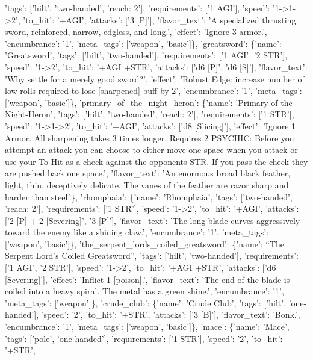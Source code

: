 \documentclass[
  letterpaper,
  DIV=11,
  numbers=noendperiod]{scrartcl}
\begin{document}
{'tags': {[}'hilt', 'two-handed', 'reach: 2'{]}, 'requirements': {[}'1
AGI'{]}, 'speed': '1-\textgreater1-\textgreater2', 'to\_hit': '+AGI',
'attacks': {[}'3 {[}P{]}'{]}, 'flavor\_text': 'A specialized thrusting
sword, reinforced, narrow, edgless, and long.', 'effect': 'Ignore 3
armor.', 'encumbrance': '1', 'meta\_tags': {[}'weapon', 'basic'{]}\},
'greatsword': \{'name': 'Greatsword', 'tags': {[}'hilt',
'two-handed'{]}, 'requirements': {[}'1 AGI', '2 STR'{]}, 'speed':
'1-\textgreater2', 'to\_hit': '+AGI +STR', 'attacks': {[}'d6 {[}P{]}',
'd6 {[}S{]}'{]}, 'flavor\_text': 'Why settle for a merely good sword?',
'effect': 'Robust Edge: increase number of low rolls required to lose
{[}sharpened{]} buff by 2', 'encumbrance': '1', 'meta\_tags':
{[}'weapon', 'basic'{]}\}, 'primary\_of\_the\_night\_heron': \{'name':
'Primary of the Night-Heron', 'tags': {[}'hilt', 'two-handed', 'reach:
2'{]}, 'requirements': {[}'1 STR'{]}, 'speed':
'1-\textgreater1-\textgreater2', 'to\_hit': '+AGI', 'attacks': {[}'d8
{[}Slicing{]}'{]}, 'effect': 'Ignore 1 Armor. All sharpening takes 3
times longer. Requires 2 PSYCHIC: Before you attempt an attack you can
choose to either move one space when you attack or use your To-Hit as a
check against the opponents STR. If you pass the check they are pushed
back one space.', 'flavor\_text': 'An enormous broad black feather,
light, thin, deceptively delicate. The vanes of the feather are razor
sharp and harder than steel.'\}, 'rhomphaia': \{'name': 'Rhomphaia',
'tags': {[}'two-handed', 'reach: 2'{]}, 'requirements': {[}'1 STR'{]},
'speed': '1-\textgreater2', 'to\_hit': '+AGI', 'attacks': {[}'2 {[}P{]}
+ 2 {[}Severing{]}', '3 {[}P{]}'{]}, 'flavor\_text': 'The long blade
curves aggressively toward the enemy like a shining claw.',
'encumbrance': '1', 'meta\_tags': {[}'weapon', 'basic'{]}\},
'the\_serpent\_lords\_coiled\_greatsword': \{'name': ``The Serpent
Lord's Coiled Greatsword'', 'tags': {[}'hilt', 'two-handed'{]},
'requirements': {[}'1 AGI', '2 STR'{]}, 'speed': '1-\textgreater2',
'to\_hit': '+AGI +STR', 'attacks': {[}'d6 {[}Severing{]}'{]}, 'effect':
'Inflict 1 {[}poison{]}.', 'flavor\_text': 'The end of the blade is
coiled into a heavy spiral. The metal has a green shine.',
'encumbrance': '1', 'meta\_tags': {[}'weapon'{]}\}, 'crude\_club':
\{'name': 'Crude Club', 'tags': {[}'hilt', 'one-handed'{]}, 'speed':
'2', 'to\_hit': '+STR', 'attacks': {[}'3 {[}B{]}'{]}, 'flavor\_text':
'Bonk.', 'encumbrance': '1', 'meta\_tags': {[}'weapon', 'basic'{]}\},
'mace': \{'name': 'Mace', 'tags': {[}'pole', 'one-handed'{]},
'requirements': {[}'1 STR'{]}, 'speed': '2', 'to\_hit': '+STR',
}
\end{document}
